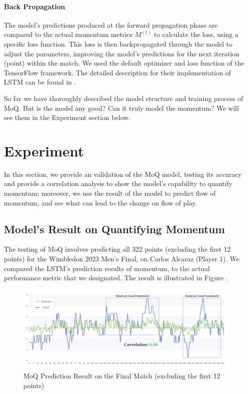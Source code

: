 \documentclass[12pt]{article}  %
\begin{document}
\paragraph{Back Propagation}
The model's predictions produced at the forward propagation phase are compared to the actual momentum metrics $M^{(t)}$ to calculate the loss, using a specific loss function. This loss is then backpropagated through the model to adjust the parameters, improving the model's predictions for the next iteration (point) within the match. We used the default optimizer and loss function of the TensorFlow framework. The detailed description for their implementation of LSTM can be found in \cite{13}.

So far we have thoroughly described the model structure and training process of MoQ. But is the model any good? Can it truly model the momentum? We will see them in the Experiment section below.




\section{Experiment}
In this section, we provide an validation of the MoQ model, testing its accuracy and provide a correlation analysis to show the model's capability to quantify momentum; moreover, we use the result of the model to predict flow of momentum, and see what can lead to the change on flow of play. 

\subsection{Model's Result on Quantifying Momentum}
The testing of MoQ involves predicting all 322 points (excluding the first 12 points) for the Wimbledon 2023 Men's Final, on Carlos Alcaraz (Player 1). We compared the LSTM's prediction results of momentum, to the actual performance metric that we designated. The result is illustrated in Figure .

\begin{figure}[htbp]  %
	\centering  %
	\includegraphics[width=\textwidth]{fluctuation.png} %
	\caption{MoQ Prediction Result on the Final Match (excluding the first 12 points)} %
\end{figure}
\vspace{-0.2cm}
\end{document}
